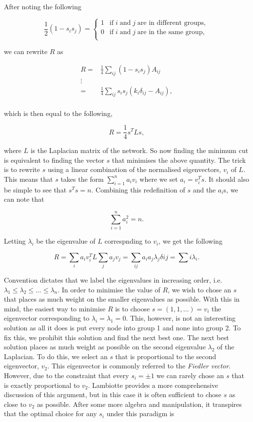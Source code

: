 \noindent
After noting the following

$$ \frac{1}{2}(1 - s_i s_j) = 
\begin{cases}
    1 & \text{if} \; i \; \text{and} \; j \; \text{are in different groups}, \\
    0 & \text{if} \; i \; \text{and} \; j \; \text{are in the same group}, \\
\end{cases}
$$

\noindent
we can rewrite $R$ as

$$
\begin{aligned}
    R =& \frac{1}{4}\sum_{ij}(1 - s_i s_j)A_{ij} \\
      \vdots & \\
      =& \frac{1}{4}\sum_{ij}s_i s_j(k_i\delta_{ij} - A_{ij}), \\
\end{aligned}
$$

\noindent
which is then equal to the following,

$$ R = \frac{1}{4}s^TLs, $$

\noindent
where $L$ is the Laplacian matrix of the network. So now finding the minimum cut is equivalent to finding the vector $s$ that minimises the above quantity. The trick is to rewrite $s$ using a linear combination of the normalised eigenvectors, $v_i$ of $L$. This means that $s$ takes the form $\sum_{i=1}^n a_iv_i$ where we set $a_i = v_i^T s$. It should also be simple to see that $s^Ts = n$. Combining this redefinition of $s$ and the $a_i$s, we can note that

$$ \sum_{i=1}^n a_i^2 = n. $$

\noindent
Letting $\lambda_i$ be the eigenvalue of $L$ correspnding to $v_i$, we get the following

$$ R = \sum_i a_iv_i^TL\sum_ja_jv_j = \sum_{ij}a_ia_j\lambda_j\delta{ij} = \sum{i}\lambda_i. $$

Convention dictates that we label the eigenvalues in increasing order, i.e. $\lambda_1 \leq \lambda_2 \leq \dots \leq \lambda_n$. In order to minimise the value of $R$, we wish to chose an $s$ that places as much weight on the smaller eigenvalues as possible. With this in mind, the easiest way to minimise $R$ is to choose $s = (1, 1, \dots) = v_i$ the eigenvector corresponding to $\lambda_i = \lambda_1 = 0$. This, however, is not an interesting solution as all it does is put every node into group 1 and none into group 2. To fix this, we prohibit this solution and find the next best one. The next best solution places as much weight as possible on the second eigenvalue $\lambda_2$ of the Laplacian. To do this, we select an $s$ that is proportional to the second eigenvector, $v_2$. This eigenvector is commonly referred to the \emph{Fiedler vector}. However, due to the constraint that every $s_i = \pm 1$ we can rarely chose an $s$ that is exactly proportional to $v_2$. Lambiotte provides a more comprehensive discussion of this argument, but in this case it is often sufficient to chose $s$ as close to $v_2$ as possible. After some more algebra and manipulation, it transpires that the optimal choice for any $s_i$ under this paradigm is 

